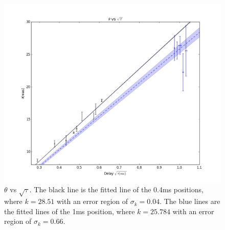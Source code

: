 \documentclass{emulateapj}
\begin{document}
\begin{figure}
\centering
\includegraphics[width=1.0\textwidth, angle=0]{Theta_tau.png}
\caption{${\theta}$ vs ${\sqrt{\tau}}$. The black line is the fitted line of the 0.4ms positions, where $k=28.51$ with an error region of $\sigma_k=0.04$. The blue lines are the fitted lines of the 1ms position, where $k=25.784$ with an error region of $\sigma_k=0.66$.
}
\end{figure}








\end{document}
